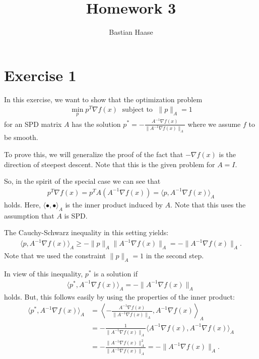 \documentclass{article}
\title{Homework 3}
\date{}
\author{Bastian Haase}
\begin{document}
\maketitle
\tableofcontents
\newpage
\section{Exercise 1}
In this exercise, we want to show that the optimization problem
\begin{align*}
  \min_{p} p^T \nabla f(x) \;\textrm{ subject to } \;\| p \|_{A}=1
\end{align*}
for an SPD matrix $A$ has the solution
$
  p^{*}=-\frac{A^{-1}\nabla f(x)}{\|A^{-1}\nabla f(x) \|_{A}}
$
where we assume $f$ to be smooth.\par
To prove this, we will generalize the proof of the fact that $-\nabla f(x)$ is the direction
of steepest descent. Note that this is the given problem for $A=I$. \par
So, in the spirit of the special case we can see that
\begin{align*}
  p^T \nabla f(x) = p^T A \left( A^{-1} \nabla f(x) \right)=\langle p , A^{-1}\nabla f(x)  \rangle_{A} 
\end{align*}
holds. Here, $\langle \bullet, \bullet \rangle_{A}$ is the inner product induced by $A$. Note that this uses
the assumption that $A$ is SPD. \par
The Cauchy-Schwarz inequality in this setting yields:
\begin{align*}
  \langle p , A^{-1}\nabla f(x)  \rangle_{A} \geq -  \| p \|_{A} \|A^{-1} \nabla f(x) \|_{A}=-\|A^{-1} \nabla f(x) \|_{A}.
\end{align*}
Note that we used the constraint $\| p \|_{A}=1$ in the second step. \par
In view of this inequality, $p^{*}$ is a solution if
\begin{align*}
   \langle p^{*} , A^{-1}\nabla f(x)  \rangle_{A} =-\|A^{-1} \nabla f(x) \|_{A}
\end{align*}
holds. But, this follows easily by using the properties of the inner product:
\begin{align*}
   \langle p^{*} , A^{-1}\nabla f(x)  \rangle_{A}&=\left  \langle -\frac{A^{-1}\nabla f(x)}{\|A^{-1}\nabla f(x) \|_{A}}
, A^{-1} \nabla f(x) \right \rangle_{A}\\
&=-\frac{1}{\|A^{-1}\nabla f(x) \|_{A}} \langle A^{-1}\nabla f(x) , A^{-1}\nabla f(x)  \rangle_{A}\\
&
=-\frac{\|A^{-1}\nabla f(x)\|_{A}^{2}}{\|A^{-1}\nabla f(x) \|_{A}}=-\|A^{-1} \nabla f(x) \|_{A}.
\end{align*}
\end{document}
